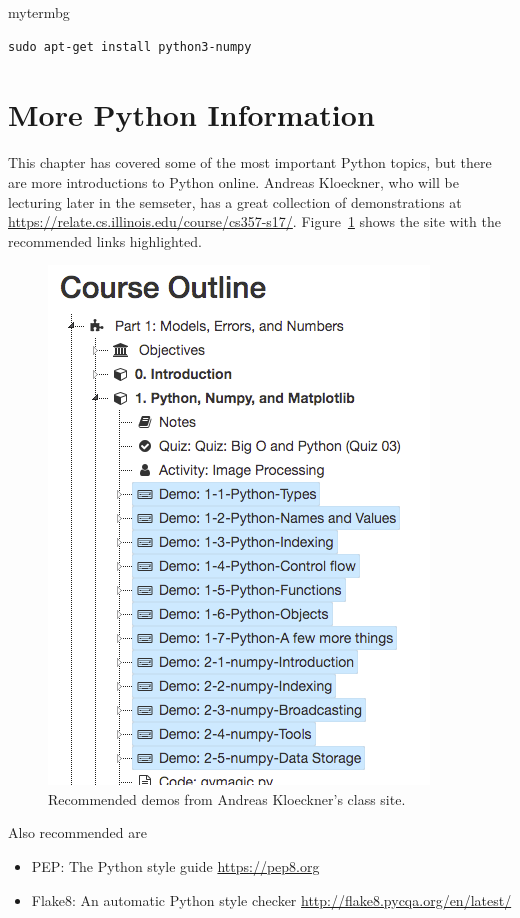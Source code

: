 \begin{tsession}{mytermbg}
\begin{verbatim}
sudo apt-get install python3-numpy
\end{verbatim}
\end{tsession}

\section{More Python Information}
This chapter has covered some of the most important Python topics,
but there are more introductions to Python online.
Andreas Kloeckner, who will be lecturing later in the semseter,
has a great collection of demonstrations at
\url{https://relate.cs.illinois.edu/course/cs357-s17/}.
Figure~\ref{fig0kloecknerSite} shows the site with the recommended links highlighted.
\begin{figure}
    \centering
    \includegraphics[height=0.5\textheight]{figures/L011/KloecknerPython.png}
    \caption{Recommended demos from Andreas Kloeckner's class site.}
    \label{fig0kloecknerSite}
\end{figure}

Also recommended are
\begin{itemize}
    \item PEP: The Python style guide \url{https://pep8.org}
    \item Flake8: An automatic Python style checker \url{http://flake8.pycqa.org/en/latest/}
\end{itemize}

